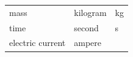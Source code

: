 {\begin{tabular}[t]{|l|l|l|}
    
        mass &
    
    
        kilogram &
    
    
        kg%
     \tabularnewline\cline{1-1}\cline{2-2}\cline{3-3}
    
    
        time &
    
    
        second &
    
    
        s%
     \tabularnewline\cline{1-1}\cline{2-2}\cline{3-3}
    
    
        electric current &
    
    
        ampere &
    
    

\end{tabular}}
